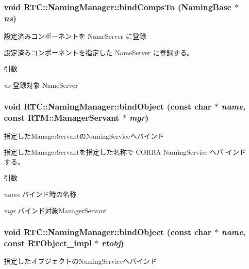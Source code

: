 \subsubsection[{bindCompsTo}]{\setlength{\rightskip}{0pt plus 5cm}void RTC::NamingManager::bindCompsTo ({\bf NamingBase} $\ast$ {\em ns})\hspace{0.3cm}{\ttfamily  [protected]}}\label{classRTC_1_1NamingManager_a7f48ebff1a98fa1e6dc30f34f6f56337}


設定済みコンポーネントを NameServer に登録 

設定済みコンポーネントを指定した NameServer に登録する。


\begin{DoxyParams}{引数}
\item[{\em ns}]登録対象 NameServer \end{DoxyParams}
\subsubsection[{bindObject}]{\setlength{\rightskip}{0pt plus 5cm}void RTC::NamingManager::bindObject (const char $\ast$ {\em name}, \/  const {\bf RTM::ManagerServant} $\ast$ {\em mgr})}\label{classRTC_1_1NamingManager_ae909f8abcff48157d70f5430a04f5cc1}


指定したManagerServantのNamingServiceへバインド 

指定したManagerServantを指定した名称で CORBA NamingService へバ インドする。


\begin{DoxyParams}{引数}
\item[{\em name}]バインド時の名称 \item[{\em mgr}]バインド対象ManagerServant \end{DoxyParams}
\subsubsection[{bindObject}]{\setlength{\rightskip}{0pt plus 5cm}void RTC::NamingManager::bindObject (const char $\ast$ {\em name}, \/  const {\bf RTObject\_\-impl} $\ast$ {\em rtobj})}\label{classRTC_1_1NamingManager_ade403b12d90cb607df901d97c3d3c32f}


指定したオブジェクトのNamingServiceへバインド 


